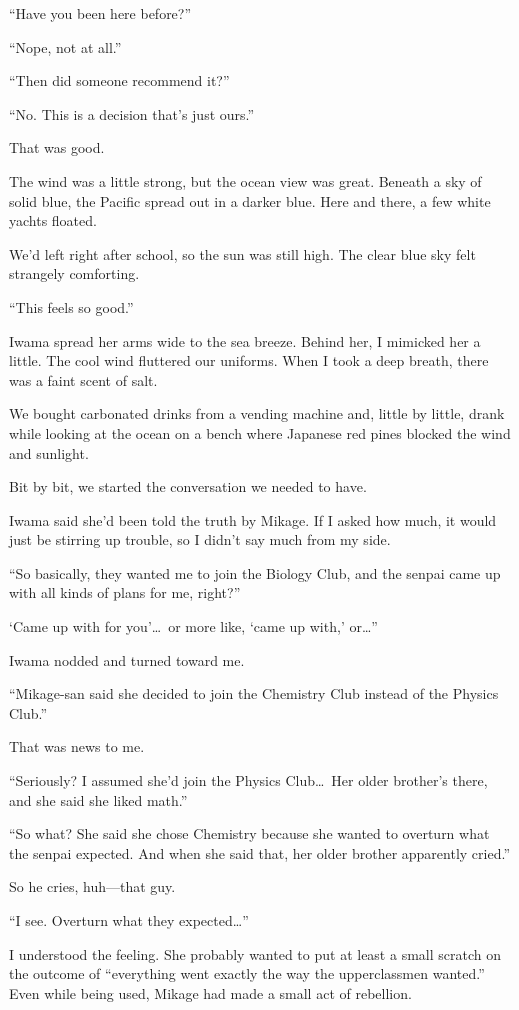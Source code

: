 \documentclass[
    a4paper,
    12pt,
    twoside,
    openany,
    UTF8,
    fontset=windows
]{ctexbook}
\begin{document}
``Have you been here before?''

``Nope, not at all.''

``Then did someone recommend it?''

``No. This is a decision that's just ours.''

That was good.

The wind was a little strong, but the ocean view was great. Beneath a sky of solid blue, the Pacific spread out in a darker blue. Here and there, a few white yachts floated.

We'd left right after school, so the sun was still high. The clear blue sky felt strangely comforting.

``This feels so good.''

Iwama spread her arms wide to the sea breeze. Behind her, I mimicked her a little. The cool wind fluttered our uniforms. When I took a deep breath, there was a faint scent of salt.

We bought carbonated drinks from a vending machine and, little by little, drank while looking at the ocean on a bench where Japanese red pines blocked the wind and sunlight.

Bit by bit, we started the conversation we needed to have.

Iwama said she'd been told the truth by Mikage. If I asked how much, it would just be stirring up trouble, so I didn't say much from my side.

``So basically, they wanted me to join the Biology Club, and the senpai came up with all kinds of plans for me, right?''

`Came up with for you'\dots\ or more like, `came up with,' or\dots''

Iwama nodded and turned toward me.

``Mikage-san said she decided to join the Chemistry Club instead of the Physics Club.''

That was news to me.

``Seriously? I assumed she'd join the Physics Club\dots\ Her older brother's there, and she said she liked math.''

``So what? She said she chose Chemistry because she wanted to overturn what the senpai expected. And when she said that, her older brother apparently cried.''

So he cries, huh---that guy.

``I see. Overturn what they expected\dots''

I understood the feeling. She probably wanted to put at least a small scratch on the outcome of ``everything went exactly the way the upperclassmen wanted.'' Even while being used, Mikage had made a small act of rebellion.
\end{document}
